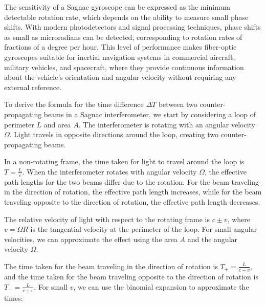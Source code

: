 \documentclass[
  a4paper,
]{book}
\begin{document}
The sensitivity of a Sagnac gyroscope can be expressed as the minimum
detectable rotation rate, which depends on the ability to measure small
phase shifts. With modern photodetectors and signal processing
techniques, phase shifts as small as microradians can be detected,
corresponding to rotation rates of fractions of a degree per hour. This
level of performance makes fiber-optic gyroscopes suitable for inertial
navigation systems in commercial aircraft, military vehicles, and
spacecraft, where they provide continuous information about the
vehicle's orientation and angular velocity without requiring any
external reference.

\begin{tcolorbox}[enhanced jigsaw, breakable, toptitle=1mm, bottomrule=.15mm, colbacktitle=quarto-callout-note-color!10!white, title=\textcolor{quarto-callout-note-color}{\faInfo}\hspace{0.5em}{Derivation Details}, arc=.35mm, rightrule=.15mm, bottomtitle=1mm, opacityback=0, toprule=.15mm, coltitle=black, leftrule=.75mm, opacitybacktitle=0.6, colback=white, left=2mm, titlerule=0mm, colframe=quarto-callout-note-color-frame]

To derive the formula for the time difference \(\Delta T\) between two
counter-propagating beams in a Sagnac interferometer, we start by
considering a loop of perimeter \(L\) and area \(A\). The interferometer
is rotating with an angular velocity \(\Omega\). Light travels in
opposite directions around the loop, creating two counter-propagating
beams.

In a non-rotating frame, the time taken for light to travel around the
loop is \(T = \frac{L}{c}\). When the interferometer rotates with
angular velocity \(\Omega\), the effective path lengths for the two
beams differ due to the rotation. For the beam traveling in the
direction of rotation, the effective path length increases, while for
the beam traveling opposite to the direction of rotation, the effective
path length decreases.

The relative velocity of light with respect to the rotating frame is
\(c \pm v\), where \(v = \Omega R\) is the tangential velocity at the
perimeter of the loop. For small angular velocities, we can approximate
the effect using the area \(A\) and the angular velocity \(\Omega\).

The time taken for the beam traveling in the direction of rotation is
\(T_+ = \frac{L}{c - v}\), and the time taken for the beam traveling
opposite to the direction of rotation is \(T_- = \frac{L}{c + v}\). For
small \(v\), we can use the binomial expansion to approximate the times:


\end{tcolorbox}
\end{document}
